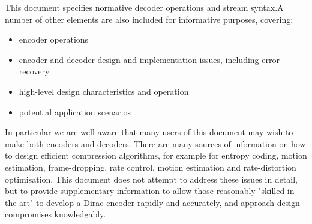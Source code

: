 This document specifies normative decoder operations and stream syntax.A 
number of other elements are also included for informative purposes, covering:

\begin{itemize}
    \item encoder operations
    \item encoder and decoder design and implementation issues, including error
recovery
	\item high-level design characteristics and operation
	\item potential application scenarios 
\end{itemize}

In particular we are well aware that many users of this document may wish
to make both encoders and decoders. There are many sources of information
on how to design efficient compression algorithms, for example for entropy coding,
motion estimation, frame-dropping, rate control, motion estimation and 
rate-distortion optimisation. This document does not attempt to address these
issues in detail, but to provide supplementary information
to allow those reasonably "skilled in the art" to develop a Dirac encoder
rapidly and accurately, and approach design compromises knowledgably.
